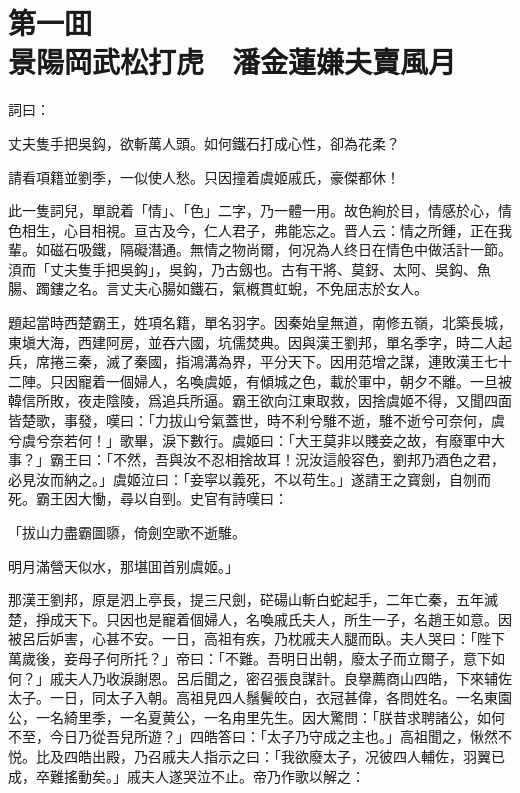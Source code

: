 
\chapter*{第一囬　\\景陽岡武松打虎　潘金蓮嫌夫賣風月}


詞曰：

\begin{myquote}
丈夫隻手把吳鈎，欲斬萬人頭。如何鐵石打成心性，卻為花柔？

請看項籍並劉季，一似使人愁。只因撞着虞姬戚氏，豪傑都休！
\end{myquote}

此一隻詞兒，單說着「情」、「色」二字，乃一體一用。故色絢於目，情感於心，情色相生，心目相視。亘古及今，仁人君子，弗能忘之。晋人云：情之所鍾，正在我輩。如磁石吸鐵，隔礙潛通。無情之物尚爾，何况為人终日在情色中做活計一節。湏而「丈夫隻手把吳鈎」，吳鈎，乃古劔也。古有干將、莫釾、太阿、吳鈎、魚腸、躅鏤之名。言丈夫心腸如鐵石，氣槪貫虹蜺，不免屈志於女人。

題起當時西楚霸王，姓項名籍，單名羽字。因秦始皇無道，南修五嶺，北築長城，東塡大海，西建阿房，並吞六國，坑儒焚典。因與漢王劉邦，單名季字，時二人起兵，席捲三秦，滅了秦國，指鴻溝為界，平分天下。因用范增之謀，連敗漢王七十二陣。只因寵着一個婦人，名喚虞姬，有傾城之色，載於軍中，朝夕不離。一旦被韓信所敗，夜走陰陵，爲追兵所逼。霸王欲向江東取救，因捨虞姬不得，又聞四面皆楚歌，事發，嘆曰：「力拔山兮氣蓋世，時不利兮騅不逝，騅不逝兮可奈何，虞兮虞兮奈若何！」歌畢，淚下數行。虞姬曰：「大王莫非以賤妾之故，有廢軍中大事？」霸王曰：「不然，吾與汝不忍相捨故耳！況汝這般容色，劉邦乃酒色之君，必見汝而納之。」虞姬泣曰：「妾寜以義死，不以苟生。」遂請王之寳劍，自刎而死。霸王因大慟，尋以自剄。史官有詩嘆曰：

\begin{myquote}
「拔山力盡霸圖隳，倚劍空歌不逝騅。

明月滿營天似水，那堪囬首别虞姬。」
\end{myquote}

那漢王劉邦，原是泗上亭長，提三尺劍，硭碭山斬白蛇起手，二年亡秦，五年滅楚，掙成天下。只因也是寵着個婦人，名喚戚氏夫人，所生一子，名趙王如意。因被呂后妒害，心甚不安。一日，高祖有疾，乃枕戚夫人腿而臥。夫人哭曰：「陛下萬歲後，妾母子何所托？」帝曰：「不難。吾明日出朝，廢太子而立爾子，意下如何？」戚夫人乃收淚謝恩。呂后聞之，密召張良謀計。良擧薦商山四皓，下來辅佐太子。一日，同太子入朝。高祖見四人鬚鬢皎白，衣冠甚偉，各問姓名。一名東園公，一名綺里季，一名夏黄公，一名甪里先生。因大驚問：「朕昔求聘諸公，如何不至，今日乃從吾兒所遊？」四皓答曰：「太子乃守成之主也。」高祖聞之，愀然不悦。比及四皓出殿，乃召戚夫人指示之曰：「我欲廢太子，况彼四人輔佐，羽翼已成，卒難搖動矣。」戚夫人遂哭泣不止。帝乃作歌以解之：

